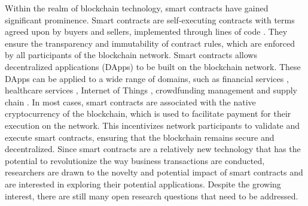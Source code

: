 \documentclass[manuscript,screen]{acmart}
\begin{document}
Within the realm of blockchain technology, smart contracts have gained significant prominence. Smart contracts are self-executing contracts with terms agreed upon by buyers and sellers, implemented through lines of code \cite{LuuCOSH16, AtzeiBC16}. They ensure the transparency and immutability of contract rules, which are enforced by all participants of the blockchain network. Smart contracts allows decentralized applications (DApps) to be built on the blockchain network. These DApps can be applied to a wide range of domains, such as financial services \cite{ZhangWLSL22}, healthcare services \cite{QahtanSZOZA23}, Internet of Things \cite{GuptaSK23}, crowdfunding management \cite{SaadatRNZ19} and supply chain \cite{SinghMGM23, SultanaTK22}. In most cases, smart contracts are associated with the native cryptocurrency of the blockchain, which is used to facilitate payment for their execution on the network. This incentivizes network participants to validate and execute smart contracts, ensuring that the blockchain remains secure and decentralized. Since smart contracts are a relatively new technology that has the potential to revolutionize the way business transactions are conducted, researchers are drawn to the novelty and potential impact of smart contracts and are interested in exploring their potential applications. Despite the growing interest, there are still many open research questions that need to be addressed.
\end{document}
